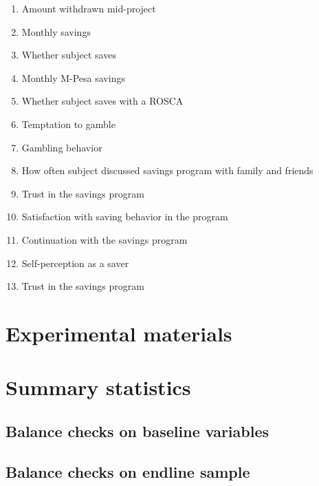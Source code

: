 \documentclass[11pt]{article}
\begin{document}
		\begin{enumerate}
		\item Amount withdrawn mid-project
		\item Monthly savings
		\item Whether subject saves
		\item Monthly M-Pesa savings
		\item Whether subject saves with a ROSCA
		\item Temptation to gamble
		\item Gambling behavior
		\item How often subject discussed savings program with family and friends
		\item Trust in the savings program
		\item Satisfaction with saving behavior in the program
		\item Continuation with the savings program
		\item Self-perception as a saver
		\item Trust in the savings program
		\end{enumerate}

\section{Experimental materials}


	\clearpage

\section{Summary statistics}

	\subsection{Balance checks on baseline variables}

        
		
		
		
		
		

	\clearpage

    \subsection{Balance checks on endline sample}
\end{document}

